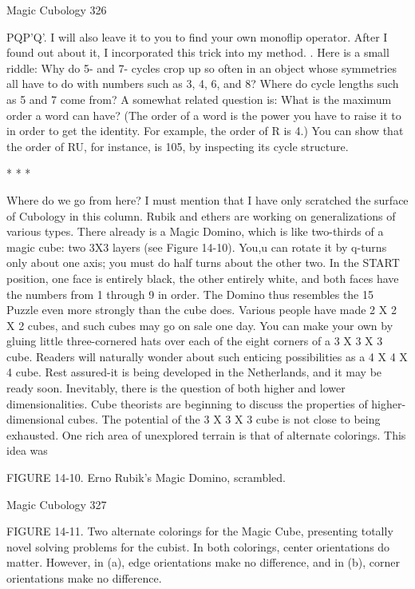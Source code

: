 Magic Cubology                                                                       326

PQP'Q'. I will also leave it to you to find your own monoflip operator. After I found
out about it, I incorporated this trick into my method.
         . Here is a small riddle: Why do 5- and 7- cycles crop up so often in an object
whose symmetries all have to do with numbers such as 3, 4, 6, and 8? Where do cycle
lengths such as 5 and 7 come from? A somewhat related question is: What is the
maximum order a word can have? (The order of a word is the power you have to raise
it to in order to get the identity. For example, the order of R is 4.) You can show that
the order of RU, for instance, is 105, by inspecting its cycle structure.

                                       *   *   *

        Where do we go from here? I must mention that I have only scratched the
surface of Cubology in this column. Rubik and ethers are working on generalizations
of various types. There already is a Magic Domino, which is like two-thirds of a
magic cube: two 3X3 layers (see Figure 14-10). You,u can rotate it by q-turns only
about one axis; you must do half turns about the other two. In the START position,
one face is entirely black, the other entirely white, and both faces have the numbers
from 1 through 9 in order. The Domino thus resembles the 15 Puzzle even more
strongly than the cube does.
        Various people have made 2 X 2 X 2 cubes, and such cubes may go on sale
one day. You can make your own by gluing little three-cornered hats over each of the
eight corners of a 3 X 3 X 3 cube. Readers will naturally wonder about such enticing
possibilities as a 4 X 4 X 4 cube. Rest assured-it is being developed in the
Netherlands, and it may be ready soon. Inevitably, there is the question of both higher
and lower dimensionalities. Cube theorists are beginning to discuss the properties of
higher-dimensional cubes.
        The potential of the 3 X 3 X 3 cube is not close to being exhausted. One rich
area of unexplored terrain is that of alternate colorings. This idea was


FIGURE 14-10. Erno Rubik's Magic Domino, scrambled.




Magic Cubology                                                                      327

FIGURE 14-11. Two alternate colorings for the Magic Cube, presenting totally novel
solving problems for the cubist. In both colorings, center orientations do matter.
However, in (a), edge orientations make no difference, and in (b), corner orientations
make no difference.

